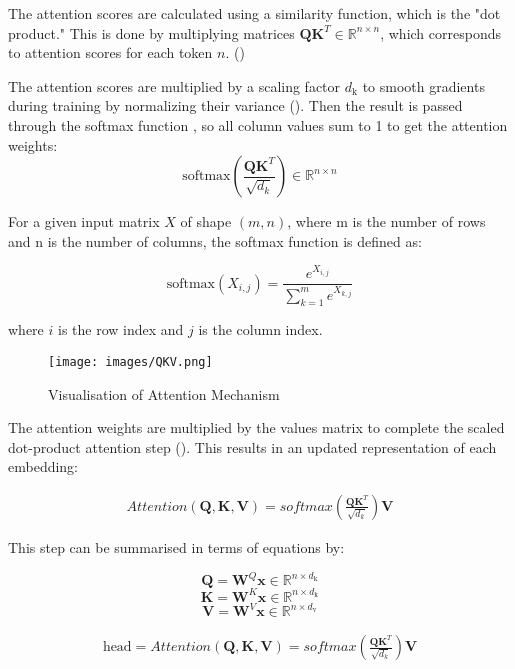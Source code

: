The attention scores are calculated using a similarity function, which is the "dot product." This is done by multiplying matrices $\mathbf{Q}\mathbf{K}^T \in \mathbb{R}^
{n \times n}$, which corresponds to attention scores for each token $n$. (\cite{tunstall_natural_2022})

The attention scores are multiplied by a scaling factor $d_{\text{k}}$ to smooth gradients during training by normalizing their variance (\cite{geron_hands-machine_2019}). Then the result is passed through the softmax function \cite{geron_hands-machine_2019}, so all column values sum to 1 to get the attention weights:
$$\text{softmax}(\frac{\mathbf{Q}\mathbf{K}^T}{\sqrt{d_k}}) \in  \mathbb{R}^
{n \times n}$$

For a given input matrix $X$ of shape $(m, n)$, where m is the number of rows and n is the number of columns, the softmax function \cite{geron_hands-machine_2019} is defined as:

$$ \mathrm{softmax}(X_{i,j}) = \frac{e^{X_{i,j}}}{\sum_{k=1}^m e^{X_{k,j}}} $$

where $i$ is the row index and $j$ is the column index.


\begin{figure}[H]
    \centering
    \texttt{[image: images/QKV.png]}
    \caption{Visualisation of Attention Mechanism}
    \label{fig:attention}
\end{figure}

The attention weights are multiplied by the values matrix to complete the scaled dot-product attention step (\cite{tunstall_natural_2022}). This results in an updated representation of each embedding:

\begin{align*}
    Attention(\mathbf{Q}, \mathbf{K}, \mathbf{V}) = softmax(\frac{\mathbf{Q}\mathbf{K}^T}{\sqrt{d_k}})\mathbf{V}
\end{align*}

This step can be summarised in terms of equations by:

$$ \mathbf{Q} = \mathbf{W}^Q \mathbf{x} \in \mathbb{R}^
{n \times d_{\text{k}}}$$
$$ \mathbf{K} = \mathbf{W}^K  \mathbf{x} \in \mathbb{R}^
{n \times d_{\text{k}}}$$
$$ \mathbf{V} = \mathbf{W}^V \mathbf{x} \in \mathbb{R}^
{n \times d_{\text{v}}}$$

\begin{align*}
    \text{head} = Attention(\mathbf{Q}, \mathbf{K}, \mathbf{V}) = softmax(\frac{\mathbf{Q}\mathbf{K}^T}{\sqrt{d_k}})\mathbf{V}
\end{align*}

